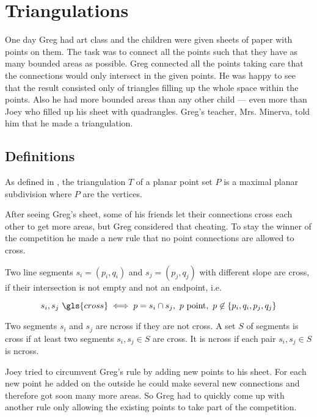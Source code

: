 \chapter{Triangulations}\label{cha:triangulations}
One day Greg had art class and the children were given sheets of
paper with points on them. The task was to connect all the points 
such that they have as many bounded areas as possible. Greg 
connected all the points taking care that the connections would only 
intersect in the given points. He was happy to see that the result 
consisted only of triangles filling up the whole space within the 
points. Also he had more bounded areas than any other child --- 
even more than Joey who filled up his sheet with quadrangles. Greg's
teacher, Mrs. Minerva, told him that he made a triangulation.

\section{Definitions}
\begin{definition}[Triangulation]\label{def:triangulation_subdivision}
As defined in \cite[Section 9.1]{deberg_compgeom}, the
triangulation \(T\) of a planar point set \(P\) is a maximal planar 
subdivision where \(P\) are the vertices.
\end{definition}

After seeing Greg's sheet, some of his friends let their connections
cross each other to get more areas, but Greg considered that
cheating. To stay the winner of the competition he made a new rule
that no point connections are allowed to cross.

\begin{definition}[Crossing]\label{def:crossing}
Two line segments \(s_i=(p_i,q_i)\) and \(s_j=(p_j,q_j)\) with 
different slope are \gls{cross}, if their intersection is not empty
and not an endpoint, i.e.

\[
  s_i, s_j~\gls{cross}
  \iff
  p = s_i\cap s_j,~
  p~\text{point},~
  p \not\in \{p_i,q_i,p_j,q_j\} \]

Two segments \(s_i\) and \(s_j\) are \gls{ncross} if they are
not \gls{cross}. A set \(S\) of segments is \gls{cross} if at least
two segments \(s_i, s_j \in S\) are \gls{cross}. It is \gls{ncross}
if each pair \(s_i, s_j \in S\) is \gls{ncross}.
\end{definition}

Joey tried to circumvent Greg's rule by adding new points to his
sheet. For each new point he added on the outside he could make
several new connections and therefore got soon many more areas. So
Greg had to quickly come up with another rule only allowing the
existing points to take part of the competition.

